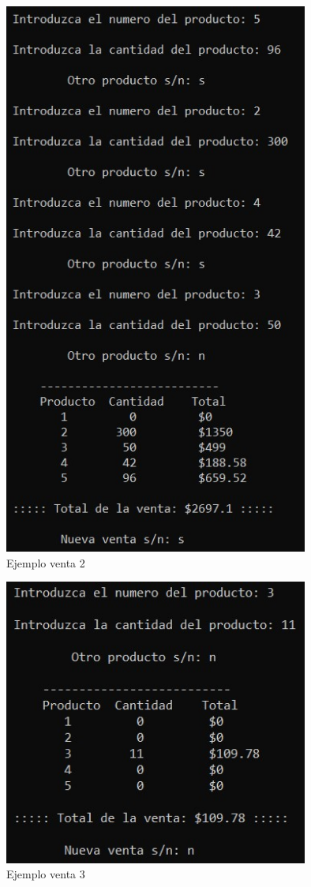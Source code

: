 \documentclass[12pt, letterpaper]{article}
\begin{document}
    \begin{figure}[p]
    \centering
    \includegraphics[width=10cm]{venta2.jpg}
    \caption {Ejemplo venta 2 \label{fig:Fig14}}
    \end{figure} 
             
    \begin{figure}[p]
    \centering
    \includegraphics[width=10cm]{venta3.jpg}
    \caption {Ejemplo venta 3 \label{fig:Fig15}}
    \end{figure}
         
\end{document}
